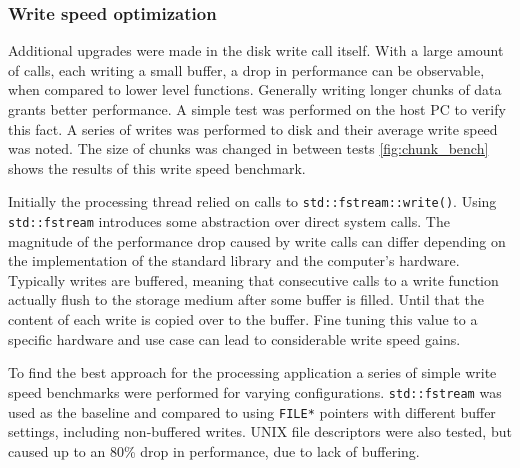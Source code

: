 \subsubsection{Write speed optimization}

Additional upgrades were made in the disk write call itself. 
With a large amount of calls, each writing a small buffer, a drop in performance 
can be observable, when compared to lower level functions. Generally writing 
longer chunks of data grants better performance. A simple test was performed
on the host PC to verify this fact. A series of writes was performed to disk
and their average write speed was noted. The size of chunks was changed in between tests
\autoref{fig:chunk_bench} shows the results of this write speed benchmark.


Initially the processing thread relied on calls to \lstinline{std::fstream::write()}.
Using \lstinline{std::fstream} introduces some abstraction over direct system calls.
The magnitude of the performance drop caused by write calls can differ 
depending on the implementation of the standard library and the computer's hardware.
Typically writes are buffered, meaning that consecutive calls to a write function
actually flush to the storage medium after some buffer is filled. Until that 
the content of each write is copied over to the buffer. Fine tuning this 
value to a specific hardware and use case can lead to considerable write speed gains.


To find the best approach for the processing application a series of simple 
write speed benchmarks were performed for varying configurations. 
\lstinline{std::fstream} was used as the baseline and compared
to using \lstinline{FILE*} pointers with different buffer settings,
including non-buffered writes. UNIX file descriptors were also tested,
but caused up to an 80\% drop in performance, due to lack of buffering.

